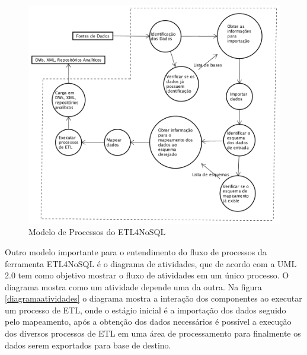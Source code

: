 \begin{figure}[h]
	\centering
	\includegraphics[scale=0.7]{fig/modelo_processo.png}
	\caption{Modelo de Processos do ETL4NoSQL}
	\label{modeloprocesso}
\end{figure}

Outro modelo importante para o entendimento do fluxo de processos da ferramenta ETL4NoSQL é o diagrama de atividades, que de acordo com a UML 2.0 tem como objetivo mostrar o fluxo de atividades em um único processo. O diagrama mostra como um atividade depende uma da outra. Na figura \ref{diagramaatividades} o diagrama mostra a interação dos componentes ao executar um processo de ETL, onde o estágio inicial é a importação dos dados seguido pelo mapeamento, após a obtenção dos dados necessários é possível a execução dos diversos processos de ETL em uma área de processamento para finalmente os dados serem exportados para base de destino.


